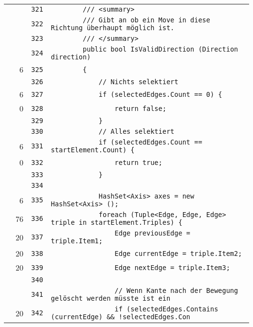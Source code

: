 \documentclass[a4paper,10pt]{article}
\begin{document}
\begin{longtable}[l]{lrrl}
\cellcolor{gray} &  & \verb~321~ & \verb~        /// <summary>~\\
\cellcolor{gray} &  & \verb~322~ & \verb~        /// Gibt an ob ein Move in diese Richtung überhaupt möglich ist.~\\
\cellcolor{gray} &  & \verb~323~ & \verb~        /// </summary>~\\
\cellcolor{gray} &  & \verb~324~ & \verb~        public bool IsValidDirection (Direction direction)~\\
\cellcolor{green} & 6 & \verb~325~ & \verb~        {~\\
\cellcolor{gray} &  & \verb~326~ & \verb~            // Nichts selektiert~\\
\cellcolor{green} & 6 & \verb~327~ & \verb~            if (selectedEdges.Count == 0) {~\\
\cellcolor{red} & 0 & \verb~328~ & \verb~                return false;~\\
\cellcolor{gray} &  & \verb~329~ & \verb~            }~\\
\cellcolor{gray} &  & \verb~330~ & \verb~            // Alles selektiert~\\
\cellcolor{green} & 6 & \verb~331~ & \verb~            if (selectedEdges.Count == startElement.Count) {~\\
\cellcolor{red} & 0 & \verb~332~ & \verb~                return true;~\\
\cellcolor{gray} &  & \verb~333~ & \verb~            }~\\
\cellcolor{gray} &  & \verb~334~ & \verb~~\\
\cellcolor{green} & 6 & \verb~335~ & \verb~            HashSet<Axis> axes = new HashSet<Axis> ();~\\
\cellcolor{green} & 76 & \verb~336~ & \verb~            foreach (Tuple<Edge, Edge, Edge> triple in startElement.Triples) {~\\
\cellcolor{green} & 20 & \verb~337~ & \verb~                Edge previousEdge = triple.Item1;~\\
\cellcolor{green} & 20 & \verb~338~ & \verb~                Edge currentEdge = triple.Item2;~\\
\cellcolor{green} & 20 & \verb~339~ & \verb~                Edge nextEdge = triple.Item3;~\\
\cellcolor{gray} &  & \verb~340~ & \verb~~\\
\cellcolor{gray} &  & \verb~341~ & \verb~                // Wenn Kante nach der Bewegung gelöscht werden müsste ist ein~\\
\cellcolor{green} & 20 & \verb~342~ & \verb~                if (selectedEdges.Contains (currentEdge) && !selectedEdges.Con~\\

\end{longtable}
\end{document}
